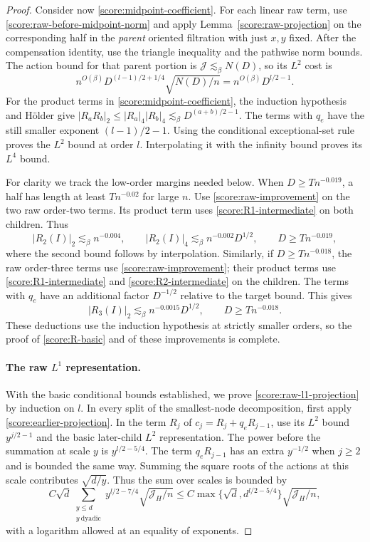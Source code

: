 \begin{proof}
Consider now \eqref{score:midpoint-coefficient}.  For each linear raw term,
use \eqref{score:raw-before-midpoint-norm} and apply
Lemma~\ref{score:raw-projection} on the corresponding half in the
\emph{parent} oriented filtration with just $x,y$ fixed.  After the
compensation identity, use the triangle inequality and the pathwise norm
bounds.  The action bound for
that parent portion is $\mathcal J\lesssim_\beta N(D)$, so its $L^2$ cost
is
\[
 n^{O(\beta)}D^{(l-1)/2+1/4}\sqrt{N(D)/n}
       =n^{O(\beta)}D^{l/2-1}.
\]
For the product terms in \eqref{score:midpoint-coefficient}, the induction
hypothesis and H\"older give
$|R_aR_b|_2\le |R_a|_4|R_b|_4\lesssim_\beta D^{(a+b)/2-1}$.
The terms with $q_e$ have the still smaller exponent $(l-1)/2-1$.
Using the conditional exceptional-set rule proves the $L^2$ bound at order
$l$.  Interpolating it with the infinity bound proves its $L^4$ bound.

For clarity we track the low-order margins needed below.  When
$D\ge Tn^{-0.019}$, a half has length at least $Tn^{-0.02}$ for large $n$.
Use \eqref{score:raw-improvement} on the two raw order-two terms.  Its
product term uses \eqref{score:R1-intermediate} on both children.  Thus
\begin{equation}\label{score:R2-intermediate}
 |R_2(I)|_2\lesssim_\beta n^{-0.004},\qquad
 |R_2(I)|_4\lesssim_\beta n^{-0.002}D^{1/2},
             \qquad D\ge Tn^{-0.019},
\end{equation}
where the second bound follows by interpolation.  Similarly, if
$D\ge Tn^{-0.018}$, the raw order-three terms use
\eqref{score:raw-improvement}; their product terms use
\eqref{score:R1-intermediate} and \eqref{score:R2-intermediate} on the
children.  The terms with $q_e$ have an additional factor $D^{-1/2}$
relative to the target bound.  This gives
\begin{equation}\label{score:R3-intermediate}
 |R_3(I)|_2\lesssim_\beta n^{-0.0015}D^{1/2},
                          \qquad D\ge Tn^{-0.018}.
\end{equation}
These deductions use the induction hypothesis at strictly smaller orders,
so the proof of \eqref{score:R-basic} and of these improvements is complete.

\paragraph{The raw $L^1$ representation.}
With the basic conditional bounds established, we prove
\eqref{score:raw-l1-projection} by induction on $l$.  In every split of the
smallest-node decomposition, first apply \eqref{score:earlier-projection}.
In the term $R_j$ of $c_j=R_j+q_eR_{j-1}$, use its $L^2$ bound
$y^{j/2-1}$ and the basic later-child $L^2$ representation.  The power
before the summation at scale $y$ is $y^{l/2-5/4}$.  The term $q_eR_{j-1}$
has an extra $y^{-1/2}$ when $j\ge2$ and is bounded the same way.  Summing
the square roots of the actions at this scale contributes $\sqrt{d/y}$.
Thus the sum over scales is bounded by
\[
 C\sqrt d\sum_{\substack{y\le d\\y\ \mathrm{dyadic}}}
       y^{l/2-7/4}\sqrt{\mathcal J_H/n}
 \le C\max\{\sqrt d,d^{l/2-5/4}\}\sqrt{\mathcal J_H/n},
\]
with a logarithm allowed at an equality of exponents.


\end{proof}
